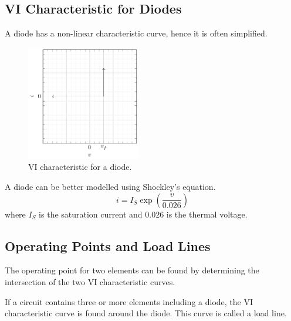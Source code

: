 \documentclass{article}
\begin{document}
\subsection{VI Characteristic for Diodes}
A diode has a non-linear characteristic curve, hence it is often simplified.
\begin{figure}[H]
    \centering
    \includegraphics[height = 5cm, keepaspectratio = true]{figures/vi_characteristic_diode.pdf}
    \caption{VI characteristic for a diode.}
\end{figure}
\begin{theorem}
    A diode can be better modelled using Shockley's equation.
    \begin{equation*}
        i = I_S \exp{\left( \frac{v}{0.026} \right)}
    \end{equation*}
    where \(I_S\) is the saturation current and \(0.026\) is the thermal voltage.
\end{theorem}
\subsection{Operating Points and Load Lines}
\begin{definition}
    The operating point for two elements can be found by determining the intersection
    of the two VI characteristic curves.
\end{definition}
\begin{definition}
    If a circuit contains three or more elements including a diode, the VI characteristic curve
    is found around the diode. This curve is called a load line.
\end{definition}
\end{document}
